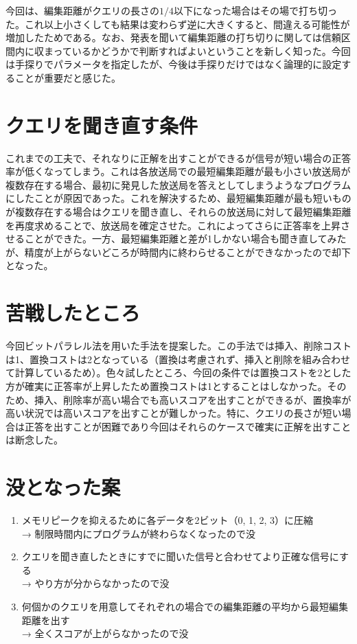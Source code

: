 \documentclass[dvipdfmx]{jsarticle}
\begin{document}
今回は、編集距離がクエリの長さの$1/4$以下になった場合はその場で打ち切った。これ以上小さくしても結果は変わらず逆に大きくすると、間違える可能性が増加したためである。なお、発表を聞いて編集距離の打ち切りに関しては信頼区間内に収まっているかどうかで判断すればよいということを新しく知った。今回は手探りでパラメータを指定したが、今後は手探りだけではなく論理的に設定することが重要だと感じた。

\section{クエリを聞き直す条件}

これまでの工夫で、それなりに正解を出すことができるが信号が短い場合の正答率が低くなってしまう。これは各放送局での最短編集距離が最も小さい放送局が複数存在する場合、最初に発見した放送局を答えとしてしまうようなプログラムにしたことが原因であった。これを解決するため、最短編集距離が最も短いものが複数存在する場合はクエリを聞き直し、それらの放送局に対して最短編集距離を再度求めることで、放送局を確定させた。これによってさらに正答率を上昇させることができた。一方、最短編集距離と差が1しかない場合も聞き直してみたが、精度が上がらないどころが時間内に終わらせることができなかったので却下となった。

\section{苦戦したところ}

今回ビットパラレル法を用いた手法を提案した。この手法では挿入、削除コストは1、置換コストは2となっている（置換は考慮されず、挿入と削除を組み合わせて計算しているため）。色々試したところ、今回の条件では置換コストを2とした方が確実に正答率が上昇したため置換コストは1とすることはしなかった。そのため、挿入、削除率が高い場合でも高いスコアを出すことができるが、置換率が高い状況では高いスコアを出すことが難しかった。特に、クエリの長さが短い場合は正答を出すことが困難であり今回はそれらのケースで確実に正解を出すことは断念した。

\section{没となった案}
\begin{enumerate}
  \item メモリピークを抑えるために各データを2ビット（0, 1, 2, 3）に圧縮 \\
    → 制限時間内にプログラムが終わらなくなったので没
  \item クエリを聞き直したときにすでに聞いた信号と合わせてより正確な信号にする \\
    → やり方が分からなかったので没
  \item 何個かのクエリを用意してそれぞれの場合での編集距離の平均から最短編集距離を出す \\
    → 全くスコアが上がらなかったので没
\end{enumerate}
\end{document}
